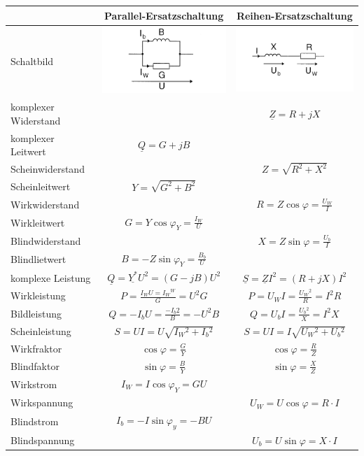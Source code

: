	\begin{centering}
	\begin{tabular}{|l|c|c|}
		\hline
			& Parallel-Ersatzschaltung & Reihen-Ersatzschaltung \\
		\hline
			Schaltbild & \includegraphics[width=5.5cm]{./images/RL_parallel.png} &
			\includegraphics[width=5.5cm]{./images/RL_Seriel.png}\\
		\hline
			komplexer Widerstand & & $\underline{Z}=R+jX$\\
			komplexer Leitwert & $\underline{Q}=G+jB$ &\\
		\hline
			Scheinwiderstand & & $Z=\sqrt{R^2+X^2}$\\
			Scheinleitwert & $Y=\sqrt{G^2+B^2}$ & \\
		\hline
			Wirkwiderstand & & $R=Z\cos\varphi=\frac{U_W}{I}$\\
			Wirkleitwert & $G=Y\cos\varphi_Y=\frac{I_W}{U}$&\\
		\hline
			Blindwiderstand & & $X=Z\sin\varphi=\frac{U_b}{I}$\\
			Blindlietwert & $B = -Z\sin\varphi_Y = \frac{B_b}{U}$&\\
		\hline
			komplexe Leistung & $\underline{Q}=
			\underline{Y^*}U^2=\left(G-jB\right)U^2$& $\underline{S}=\underline{Z}I^2=\left(R+jX\right)I^2$\\
			Wirkleistung & $P=\frac{I_WU=I{_W}{^W}}{G}=U^2G$ &
			$P=U_WI=\frac{U{_W}{^2}}{R}=I^2R$ \\
			Bildleistung & $Q=-I_bU=\frac{-I{_b}{2}}{B}=-U^2B$ & $Q = U_bI =
			\frac{U{_b}{^2}}{X}=I^2X$\\
			Scheinleistung & $S=UI=U\sqrt{I{_W}{^2}+I{_b}{^2}}$ & $S=UI =
			I\sqrt{U{_W}{^2}+U{_b}{^2}}$\\
		\hline
			Wirkfraktor & $\cos\varphi= \frac{G}{Y}$ & $\cos\varphi=\frac{R}{Z}$\\
			Blindfaktor & $\sin\varphi= \frac{B}{Y}$ & $\sin\varphi=\frac{X}{Z}$\\
		\hline
			Wirkstrom & $I_W=I\cos\varphi_Y=GU$ & \\
			Wirkspannung & & $U_W = U\cos\varphi =R \cdot I$ \\
		\hline
			Blindstrom & $I_b = -I \sin\varphi_y = -BU$ & \\
			Blindspannung & & $U_b=U\sin\varphi=X\cdot I$\\
		\hline
	\end{tabular}\\
	\end{centering}
